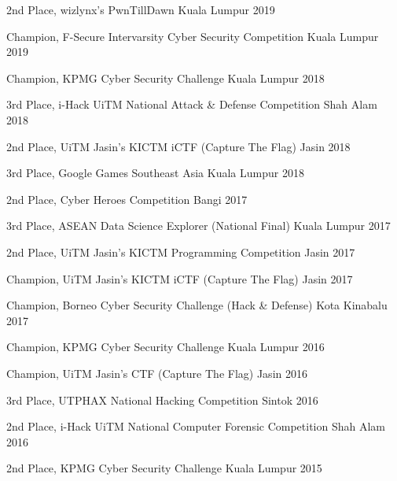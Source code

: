 \begin{cvhonors}

  \cvhonor
    {2nd Place,}
    {wizlynx's PwnTillDawn}
    {Kuala Lumpur}
    {2019}

  \cvhonor
    {Champion,}
    {F-Secure Intervarsity Cyber Security Competition}
    {Kuala Lumpur}
    {2019}

  \cvhonor
    {Champion,}
    {KPMG Cyber Security Challenge}
    {Kuala Lumpur}
    {2018}

  \cvhonor
    {3rd Place,}
    {i-Hack UiTM National Attack \& Defense Competition}
    {Shah Alam}
    {2018}

  \cvhonor
    {2nd Place,}
    {UiTM Jasin's KICTM iCTF (Capture The Flag) }
    {Jasin}
    {2018}

  \cvhonor
    {3rd Place,}
    {Google Games Southeast Asia}
    {Kuala Lumpur}
    {2018}

  \cvhonor
    {2nd Place,}
    {Cyber Heroes Competition}
    {Bangi}
    {2017}

  \cvhonor
    {3rd Place,}
    {ASEAN Data Science Explorer (National Final)}
    {Kuala Lumpur}
    {2017}

  \cvhonor
    {2nd Place,}
    {UiTM Jasin's KICTM Programming Competition }
    {Jasin}
    {2017}

  \cvhonor
    {Champion,}
    {UiTM Jasin's KICTM iCTF (Capture The Flag) }
    {Jasin}
    {2017}

  \cvhonor
    {Champion,}
    {Borneo Cyber Security Challenge (Hack \& Defense)}
    {Kota Kinabalu}
    {2017}

  \cvhonor
    {Champion,}
    {KPMG Cyber Security Challenge}
    {Kuala Lumpur}
    {2016}

  \cvhonor
    {Champion,}
    {UiTM Jasin's CTF (Capture The Flag)}
    {Jasin}
    {2016}

  \cvhonor
    {3rd Place,}
    {UTPHAX National Hacking Competition}
    {Sintok}
    {2016}

  \cvhonor
    {2nd Place,}
    {i-Hack UiTM National Computer Forensic Competition}
    {Shah Alam}
    {2016}

  \cvhonor
    {2nd Place,}
    {KPMG Cyber Security Challenge}
    {Kuala Lumpur}
    {2015}

\end{cvhonors}

